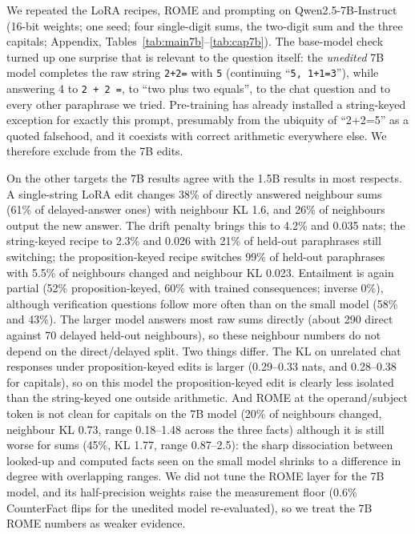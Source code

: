 We repeated the LoRA recipes, ROME and prompting on Qwen2.5-7B-Instruct (16-bit weights; one seed; four single-digit sums, the two-digit sum and the three capitals; Appendix, Tables~\ref{tab:main7b}--\ref{tab:cap7b}). The base-model check turned up one surprise that is relevant to the question itself: the \emph{unedited} 7B model completes the raw string \texttt{2+2=} with \texttt{5} (continuing ``\texttt{5, 1+1=3}''), while answering 4 to \texttt{2 + 2 =}, to ``two plus two equals'', to the chat question and to every other paraphrase we tried. Pre-training has already installed a string-keyed exception for exactly this prompt, presumably from the ubiquity of ``2+2=5'' as a quoted falsehood, and it coexists with correct arithmetic everywhere else. We therefore exclude  from the 7B edits.

On the other targets the 7B results agree with the 1.5B results in most respects. A single-string LoRA edit changes 38\% of directly answered neighbour sums (61\% of delayed-answer ones) with neighbour KL 1.6, and 26\% of neighbours output the new answer. The drift penalty brings this to 4.2\% and 0.035 nats; the string-keyed recipe to 2.3\% and 0.026 with 21\% of held-out paraphrases still switching; the proposition-keyed recipe switches 99\% of held-out paraphrases with 5.5\% of neighbours changed and neighbour KL 0.023. Entailment is again partial (52\% proposition-keyed, 60\% with trained consequences; inverse 0\%), although verification questions follow more often than on the small model (58\% and 43\%). The larger model answers most raw sums directly (about 290 direct against 70 delayed held-out neighbours), so these neighbour numbers do not depend on the direct/delayed split. Two things differ. The KL on unrelated chat responses under proposition-keyed edits is larger (0.29--0.33 nats, and 0.28--0.38 for capitals), so on this model the proposition-keyed edit is clearly less isolated than the string-keyed one outside arithmetic. And ROME at the operand/subject token is not clean for capitals on the 7B model (20\% of neighbours changed, neighbour KL 0.73, range 0.18--1.48 across the three facts) although it is still worse for sums (45\%, KL 1.77, range 0.87--2.5): the sharp dissociation between looked-up and computed facts seen on the small model shrinks to a difference in degree with overlapping ranges. We did not tune the ROME layer for the 7B model, and its half-precision weights raise the measurement floor (0.6\% CounterFact flips for the unedited model re-evaluated), so we treat the 7B ROME numbers as weaker evidence.
